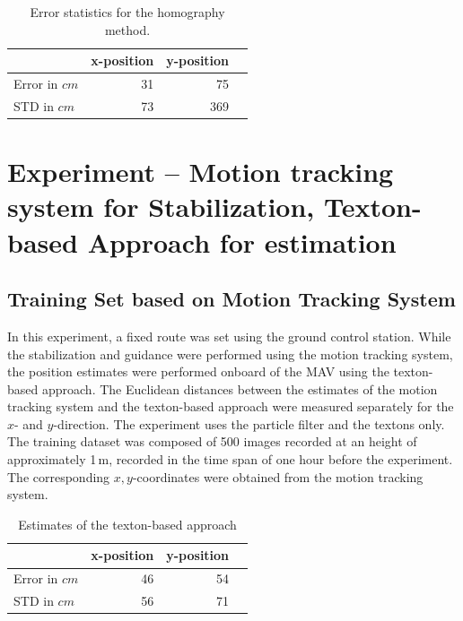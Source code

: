 \documentclass{report}
\begin{document}
\begin{table}[H]
  \centering
  \begin{tabular}{lrrr}
    \toprule
    & x-position & y-position\\
    \midrule
    Error in $cm$ & 31 & 75\\
    STD in $cm$ & 73 & 369\\
    \bottomrule
  \end{tabular}
  \caption[Error statistics homography method.]{Error statistics for the homography method.}
  \label{tab:homoerror}
\end{table}


\section{Experiment -- Motion tracking system for Stabilization,
  Texton-based Approach for estimation}

\subsection{Training Set based on Motion Tracking System}
\label{sec:experiment-real}

In this experiment, a fixed route was set using the ground control
station. While the stabilization and guidance were performed using the
motion tracking system, the position estimates were performed onboard
of the MAV using the texton-based approach. The Euclidean distances
between the estimates of the motion tracking system and the
texton-based approach were measured separately for the $x$- and
$y$-direction. The experiment uses the particle filter and the textons
only. The training dataset was composed of 500 images recorded at an
height of approximately 1\,m, recorded in the time span of one hour
before the experiment. The corresponding $x,y$-coordinates were
obtained from the motion tracking system.

\begin{table}[H]
  \centering
  \begin{tabular}{lrrr}
    \toprule
    & x-position & y-position\\
    \midrule
    Error in $cm$ & 46 & 54\\
    STD in $cm$ & 56 & 71\\
    \bottomrule
  \end{tabular}
  \caption[Estimates of the texton-based approach]{Estimates of the texton-based approach}
  \label{tab:route}
\end{table}
\end{document}

